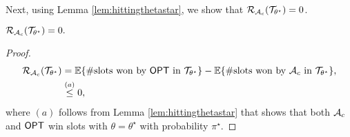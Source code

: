 Next, using Lemma \ref{lem:hittingthetastar}, we show that $\mathcal{R}_{\mathcal{A}_c}( \mathcal{T}_{\theta^\star})=0$.
\begin{lemma}\label{lem:RAstar}
  $\mathcal{R}_{\mathcal{A}_c}( \mathcal{T}_{\theta^\star})=0.$
\end{lemma}
\begin{proof}\nonumber
\begin{align} \cR_{\cA_c}( \cT_{\theta^\star})  & = \bbE\{\#\text{slots won by} \ \opt \ \text{in} \ \cT_{\theta^\star}\}    -  \bbE\{\#\text{slots won by} \  \cA_c \ \text{in} \ \cT_{\theta^\star} \}, \\
&  \stackrel{(a)}\le  0,
\end{align}
where $(a)$ follows from Lemma \ref{lem:hittingthetastar} that shows that both $\mathcal{A}_c$ and $\mathsf{OPT}$ win slots with $\theta=\theta^\star$ with probability $\pi^\star$.
\end{proof}
\vspace{-0.1in}


